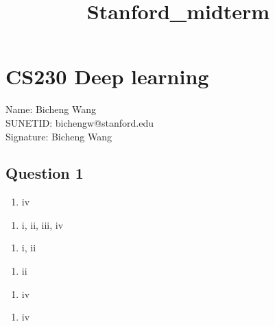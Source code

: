 \documentclass[11pt]{article}
\title{Stanford\_midterm}
\providecommand{\tightlist}{%
      \setlength{\itemsep}{0pt}\setlength{\parskip}{0pt}}
\begin{document}
    
    \maketitle
    
    

    
    \hypertarget{cs230-deep-learning}{%
\section{CS230 Deep learning}\label{cs230-deep-learning}}

    Name: Bicheng Wang\\
SUNETID: bichengw@stanford.edu\\
Signature: Bicheng Wang

    \hypertarget{question-1}{%
\subsection{Question 1}\label{question-1}}

    \begin{enumerate}
\def\labelenumi{(\alph{enumi})}
\tightlist
\item
  iv
\end{enumerate}

    \begin{enumerate}
\def\labelenumi{(\alph{enumi})}
\setcounter{enumi}{1}
\tightlist
\item
  i, ii, iii, iv
\end{enumerate}

    \begin{enumerate}
\def\labelenumi{(\alph{enumi})}
\setcounter{enumi}{2}
\tightlist
\item
  i, ii
\end{enumerate}

    \begin{enumerate}
\def\labelenumi{(\alph{enumi})}
\setcounter{enumi}{3}
\tightlist
\item
  ii
\end{enumerate}

    \begin{enumerate}
\def\labelenumi{(\alph{enumi})}
\setcounter{enumi}{4}
\tightlist
\item
  iv
\end{enumerate}

    \begin{enumerate}
\def\labelenumi{(\alph{enumi})}
\setcounter{enumi}{5}
\tightlist
\item
  iv
\end{enumerate}
\end{document}
